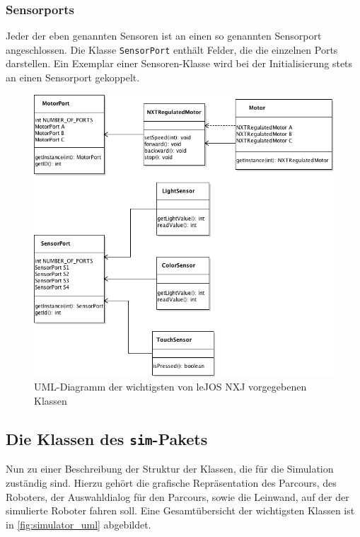 \documentclass[paper=a4, DIV=14, BCOR=15mm, twoside=on, onecolumn=on, open = right, titlepage =on, parskip =half, headsepline = on, footsepline = on, chapterprefix = on, appendixprefix = off, fontsize = 12pt, numbers = noenddot, abstract = on]{scrbook}
\begin{document}
\subsubsection{Sensorports}
Jeder der eben genannten Sensoren ist an einen so genannten Sensorport angeschlossen. Die Klasse \texttt{SensorPort} enthält Felder, die die einzelnen Ports darstellen. Ein Exemplar einer Sensoren-Klasse wird bei der Initialisierung stets an einen Sensorport gekoppelt. 

\begin{figure}[htpb]
\centering
\includegraphics[scale=0.65]{images/uml_api_essenz.png}
\caption{UML-Diagramm der wichtigsten von leJOS NXJ vorgegebenen Klassen}
\label{fig:api_uml}
\end{figure}

\par \singlespacing
\subsection{Die Klassen des \texttt{sim}-Pakets}
\onehalfspacing
Nun zu einer Beschreibung der Struktur der Klassen, die für die Simulation zuständig sind. Hierzu gehört die grafische Repräsentation des Parcours, des Roboters, der Auswahldialog für den Parcours, sowie die Leinwand, auf der der simulierte Roboter fahren soll. Eine Gesamtübersicht der wichtigsten Klassen ist in \ref{fig:simulator_uml} abgebildet.
\end{document}

